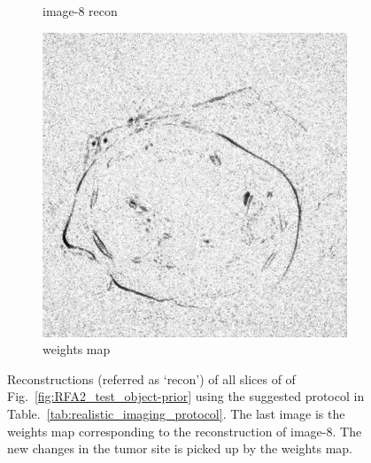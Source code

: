\documentclass[journal]{IEEEtran}
\begin{document}
\begin{figure}[!h]
\begin{subfigure}[b]{0.24\linewidth}
\captionsetup{labelformat=empty}       
 \caption{image-8 recon}
    \end{subfigure}
       \begin{subfigure}[b]{0.24\linewidth}
        \includegraphics[width=\textwidth]{../images/tmh/RFA2/new_protocol/weightsIm_all_methods_kk_0_01.png}
\captionsetup{labelformat=empty}       
 \caption{weights map}
    \end{subfigure}
       \caption{Reconstructions (referred as `recon') of all slices of  of Fig.~\ref{fig:RFA2_test_object-prior} using the suggested protocol in Table.~\ref{tab:realistic_imaging_protocol}. The last image is the weights map corresponding to the reconstruction of image-8. The new changes in the tumor site is picked up by the weights map. }
\label{fig:RFA2_new_protocol}
\end{figure}
\end{document}
